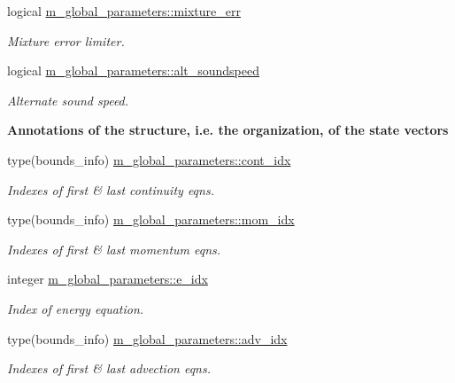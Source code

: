 \begin{Indent}
\begin{DoxyCompactItemize}
logical \hyperlink{namespacem__global__parameters_a3981c7e6886ba3cde245ce4dcc6ca664}{m\+\_\+global\+\_\+parameters\+::mixture\+\_\+err}
\begin{DoxyCompactList}\small\item\em Mixture error limiter. \end{DoxyCompactList}\item 
logical \hyperlink{namespacem__global__parameters_a5a19b6ba65c32dfc21f4762eceb25f29}{m\+\_\+global\+\_\+parameters\+::alt\+\_\+soundspeed}
\begin{DoxyCompactList}\small\item\em Alternate sound speed. \end{DoxyCompactList}\end{DoxyCompactItemize}
\end{Indent}
\begin{Indent}\textbf{ Annotations of the structure, i.\+e. the organization, of the state vectors}\par
\begin{DoxyCompactItemize}
\item 
type(bounds\+\_\+info) \hyperlink{namespacem__global__parameters_adefe3b78bf286d73a56aef49880dfb0d}{m\+\_\+global\+\_\+parameters\+::cont\+\_\+idx}
\begin{DoxyCompactList}\small\item\em Indexes of first \& last continuity eqns. \end{DoxyCompactList}\item 
type(bounds\+\_\+info) \hyperlink{namespacem__global__parameters_ad138d35528cf27ff42dba00d13c269be}{m\+\_\+global\+\_\+parameters\+::mom\+\_\+idx}
\begin{DoxyCompactList}\small\item\em Indexes of first \& last momentum eqns. \end{DoxyCompactList}\item 
integer \hyperlink{namespacem__global__parameters_ac6ef72ca6aa7a22e60c864df25559892}{m\+\_\+global\+\_\+parameters\+::e\+\_\+idx}
\begin{DoxyCompactList}\small\item\em Index of energy equation. \end{DoxyCompactList}\item 
type(bounds\+\_\+info) \hyperlink{namespacem__global__parameters_ae8e6c40b6ec73cb126b0cce7496e0057}{m\+\_\+global\+\_\+parameters\+::adv\+\_\+idx}
\begin{DoxyCompactList}\small\item\em Indexes of first \& last advection eqns. \end{DoxyCompactList}\item 

\end{DoxyCompactItemize}
\end{Indent}
